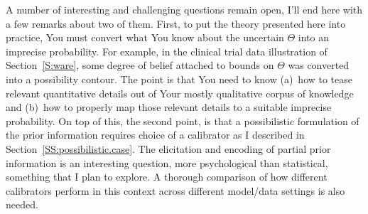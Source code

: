 \documentclass[a4paper, 12pt]{article}
\theoremstyle{plain}
\theoremstyle{definition}
\theoremstyle{remark}
\begin{document}
A number of interesting and challenging questions remain open, I'll end here with a few remarks about two of them.  First, to put the theory presented here into practice, You must convert what You know about the uncertain $\Theta$ into an imprecise probability.  For example, in the clinical trial data illustration of Section~\ref{S:ware}, some degree of belief attached to bounds on $\Theta$ was converted into a possibility contour.  The point is that You need to know (a)~how to tease relevant quantitative details out of Your mostly qualitative corpus of knowledge and (b)~how to properly map those relevant details to a suitable imprecise probability.  On top of this, the second point, is that a possibilistic formulation of the prior information requires choice of a calibrator as I described in Section~\ref{SS:possibilistic.case}.  The elicitation and encoding of partial prior information is an interesting question, more psychological than statistical, something that I plan to explore.  A thorough comparison of how different calibrators perform in this context across different model/data settings is also needed. 

\end{document}
